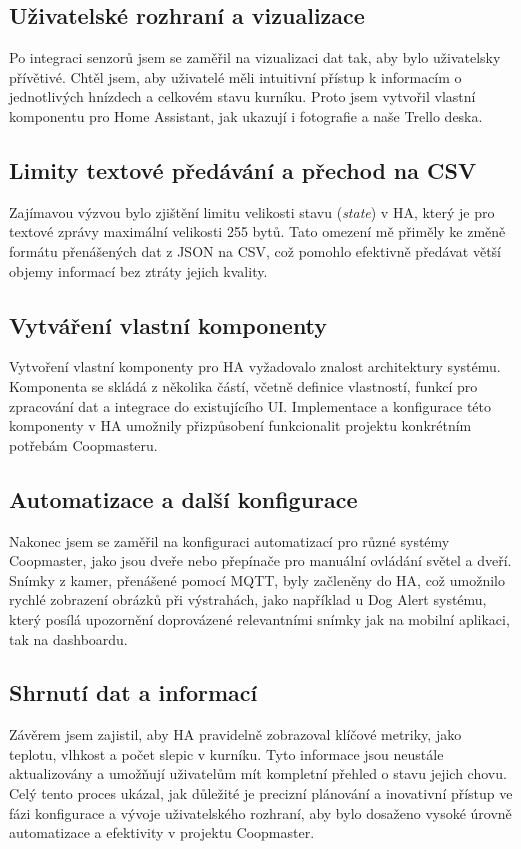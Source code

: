 \subsection*{Uživatelské rozhraní a vizualizace}

Po integraci senzorů jsem se zaměřil na vizualizaci dat tak, aby bylo uživatelsky přívětivé.
Chtěl jsem, aby uživatelé měli intuitivní přístup k informacím o jednotlivých hnízdech a celkovém stavu kurníku.
Proto jsem vytvořil vlastní komponentu pro Home Assistant, jak ukazují i fotografie a naše Trello deska.

\subsection*{Limity textové předávání a přechod na CSV}

Zajímavou výzvou bylo zjištění limitu velikosti stavu (\textit{state}) v HA, který je pro textové zprávy maximální velikosti 255 bytů.
Tato omezení mě přiměly ke změně formátu přenášených dat z JSON na CSV, což pomohlo efektivně předávat větší objemy informací bez ztráty jejich kvality.

\subsection*{Vytváření vlastní komponenty}

Vytvoření vlastní komponenty pro HA vyžadovalo znalost architektury systému.
Komponenta se skládá z několika částí, včetně definice vlastností, funkcí pro zpracování dat a integrace do existujícího UI. Implementace a konfigurace této komponenty v HA umožnily přizpůsobení funkcionalit projektu konkrétním potřebám Coopmasteru.

\subsection*{Automatizace a další konfigurace}

Nakonec jsem se zaměřil na konfiguraci automatizací pro různé systémy Coopmaster, jako jsou dveře nebo přepínače pro manuální ovládání světel a dveří.
Snímky z kamer, přenášené pomocí MQTT, byly začleněny do HA, což umožnilo rychlé zobrazení obrázků při výstrahách, jako například u Dog Alert systému, který posílá upozornění doprovázené relevantními snímky jak na mobilní aplikaci, tak na dashboardu.

\subsection*{Shrnutí dat a informací}

Závěrem jsem zajistil, aby HA pravidelně zobrazoval klíčové metriky, jako teplotu, vlhkost a počet slepic v kurníku.
Tyto informace jsou neustále aktualizovány a umožňují uživatelům mít kompletní přehled o stavu jejich chovu.
Celý tento proces ukázal, jak důležité je precizní plánování a inovativní přístup ve fázi konfigurace a vývoje uživatelského rozhraní, aby bylo dosaženo vysoké úrovně automatizace a efektivity v projektu Coopmaster.
